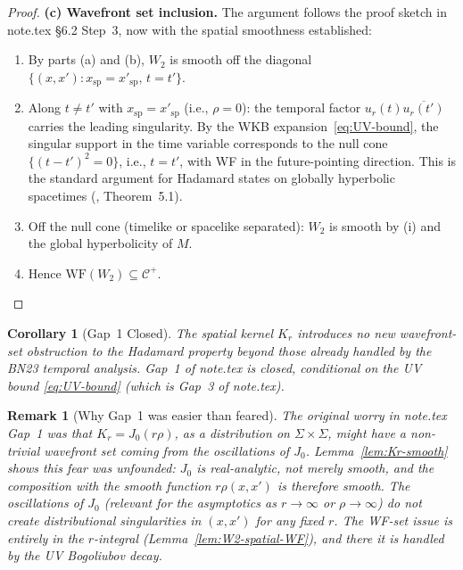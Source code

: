 \documentclass[12pt, a4paper]{article}
\newtheorem{corollary}[theorem]{Corollary}
\newtheorem{remark}[theorem]{Remark}
\theoremstyle{remark}
\newcommand{\WF}{\mathrm{WF}}
\begin{document}
\begin{proof}
  \textbf{(c) Wavefront set inclusion.}
  The argument follows the proof sketch in note.tex §6.2 Step~3,
  now with the spatial smoothness established:
  \begin{enumerate}
    \item[(i)] By parts (a) and (b), $W_2$ is smooth off the diagonal
      $\{(x,x') : x_{\mathrm{sp}} = x'_{\mathrm{sp}},\, t = t'\}$.
    \item[(ii)] Along $t \ne t'$ with $x_{\mathrm{sp}} = x'_{\mathrm{sp}}$
      (i.e., $\rho = 0$): the temporal factor $u_r(t)\overline{u_r(t')}$
      carries the leading singularity. By the WKB expansion~\eqref{eq:UV-bound},
      the singular support in the time variable corresponds to the
      null cone $\{(t-t')^2 = 0\}$, i.e., $t = t'$, with WF in the
      future-pointing direction. This is the standard argument for Hadamard
      states on globally hyperbolic spacetimes (\cite{Rad96}, Theorem~5.1).
    \item[(iii)] Off the null cone (timelike or spacelike separated):
      $W_2$ is smooth by (i) and the global hyperbolicity of $M$.
    \item[(iv)] Hence $\WF(W_2) \subseteq \mathcal{C}^+$.
  \end{enumerate}
\end{proof}

\begin{corollary}[Gap~1 Closed]\label{cor:Gap1}
  The spatial kernel $K_r$ introduces no new wavefront-set obstruction
  to the Hadamard property beyond those already handled by the BN23
  temporal analysis.  Gap~1 of note.tex is closed, conditional on the
  UV bound \eqref{eq:UV-bound} (which is Gap~3 of note.tex).
\end{corollary}

\begin{remark}[Why Gap~1 was easier than feared]\label{rem:easier}
  The original worry in note.tex Gap~1 was that $K_r = J_0(r\rho)$,
  as a distribution on $\Sigma \times \Sigma$, might have a non-trivial
  wavefront set coming from the oscillations of $J_0$.  Lemma~\ref{lem:Kr-smooth}
  shows this fear was unfounded: $J_0$ is \emph{real-analytic}, not merely
  smooth, and the composition with the smooth function $r\rho(x,x')$ is
  therefore smooth.  The oscillations of $J_0$ (relevant for the
  \emph{asymptotics} as $r \to \infty$ or $\rho \to \infty$) do not
  create distributional singularities in $(x,x')$ for any \emph{fixed} $r$.
  The WF-set issue is entirely in the $r$-integral (Lemma~\ref{lem:W2-spatial-WF}),
  and there it is handled by the UV Bogoliubov decay.
\end{remark}
\end{document}
